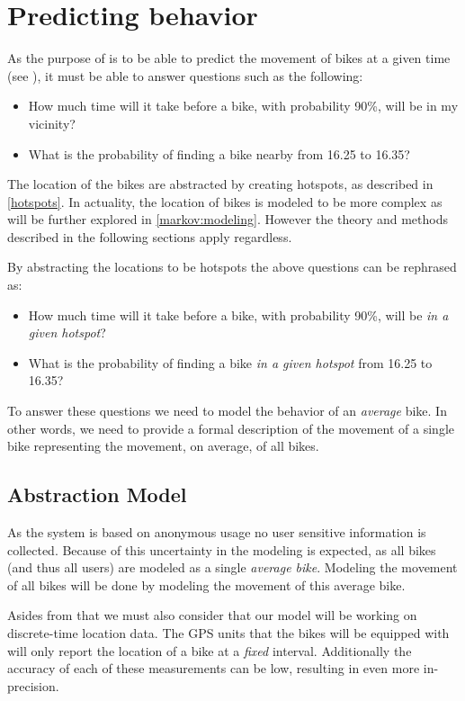 \section{Predicting behavior}
As the purpose of \projectname{} is to be able to predict the movement of bikes at a given time (see ), it must be able to answer questions such as the following:
\begin{itemize}
\item How much time will it take before a bike, with probability 90\%, will be in my vicinity?
\item What is the probability of finding a bike nearby from 16.25 to 16.35?
\end{itemize}

The location of the bikes are abstracted by creating hotspots, as described in \cref{hotspots}.
In actuality, the location of bikes is modeled to be more complex as will be further explored in \cref{markov:modeling}.
However the theory and methods described in the following sections apply regardless.

By abstracting the locations to be hotspots the above questions can be rephrased as:

\begin{itemize}
\item How much time will it take before a bike, with probability 90\%, will be \textit{in a given hotspot}?
\item What is the probability of finding a bike \textit{in a given hotspot} from 16.25 to 16.35?
\end{itemize}

To answer these questions we need to model the behavior of an \textit{average} bike.
In other words, we need to provide a formal description of the movement of a single bike representing the movement, on average, of all bikes.

\subsection{Abstraction Model}
As the system is based on anonymous usage no user sensitive information is collected.
Because of this uncertainty in the modeling is expected, as all bikes (and thus all users) are modeled as a single \textit{average bike}.
Modeling the movement of all bikes will be done by modeling the movement of this average bike.

Asides from that we must also consider that our model will be working on discrete-time location data.
The GPS units that the bikes will be equipped with will only report the location of a bike at a \textit{fixed} interval.
Additionally the accuracy of each of these measurements can be low, resulting in even more in-precision.

